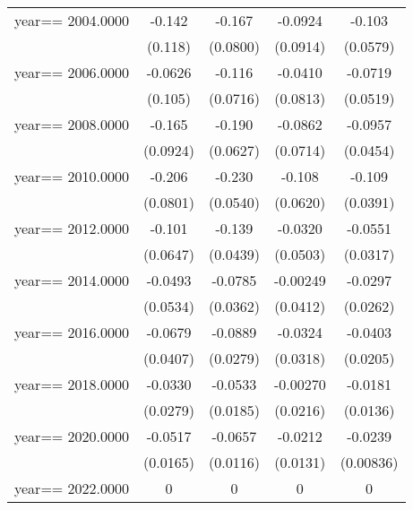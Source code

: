 \begin{table}[htbp]
\begin{tabular}{l*{4}{c}}
\addlinespace
year==  2004.0000&   -0.142         &   -0.167\sym{**} &  -0.0924         &   -0.103\sym{*}  \\
                &  (0.118)         & (0.0800)         & (0.0914)         & (0.0579)         \\
\addlinespace
year==  2006.0000&  -0.0626         &   -0.116         &  -0.0410         &  -0.0719         \\
                &  (0.105)         & (0.0716)         & (0.0813)         & (0.0519)         \\
\addlinespace
year==  2008.0000&   -0.165\sym{*}  &   -0.190\sym{***}&  -0.0862         &  -0.0957\sym{**} \\
                & (0.0924)         & (0.0627)         & (0.0714)         & (0.0454)         \\
\addlinespace
year==  2010.0000&   -0.206\sym{**} &   -0.230\sym{***}&   -0.108\sym{*}  &   -0.109\sym{***}\\
                & (0.0801)         & (0.0540)         & (0.0620)         & (0.0391)         \\
\addlinespace
year==  2012.0000&   -0.101         &   -0.139\sym{***}&  -0.0320         &  -0.0551\sym{*}  \\
                & (0.0647)         & (0.0439)         & (0.0503)         & (0.0317)         \\
\addlinespace
year==  2014.0000&  -0.0493         &  -0.0785\sym{**} & -0.00249         &  -0.0297         \\
                & (0.0534)         & (0.0362)         & (0.0412)         & (0.0262)         \\
\addlinespace
year==  2016.0000&  -0.0679\sym{*}  &  -0.0889\sym{***}&  -0.0324         &  -0.0403\sym{**} \\
                & (0.0407)         & (0.0279)         & (0.0318)         & (0.0205)         \\
\addlinespace
year==  2018.0000&  -0.0330         &  -0.0533\sym{***}& -0.00270         &  -0.0181         \\
                & (0.0279)         & (0.0185)         & (0.0216)         & (0.0136)         \\
\addlinespace
year==  2020.0000&  -0.0517\sym{***}&  -0.0657\sym{***}&  -0.0212         &  -0.0239\sym{***}\\
                & (0.0165)         & (0.0116)         & (0.0131)         &(0.00836)         \\
\addlinespace
year==  2022.0000&        0         &        0         &        0         &        0         \\

\end{tabular}
\end{table}
